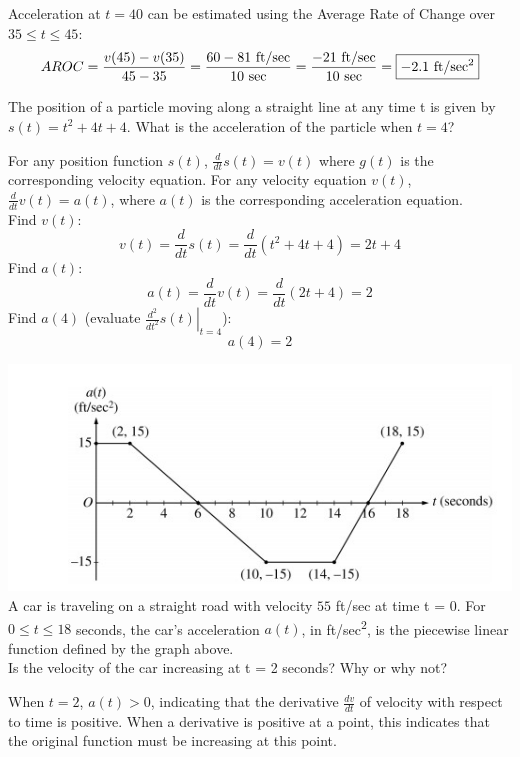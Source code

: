 \documentclass[12pt,letterpaper, onecolumn]{exam}
\newcommand\at[2]{\left.#1\right|_{#2}}
\begin{document}
\begin{questions}
\begin{solution}
	Acceleration at $t=40$ can be estimated using the Average Rate of Change over $35 \leq t \leq 45$:
	$$AROC=\frac{v(45)-v(35)}{45-35}=\frac{60-81 \text{ ft/sec}}{10 \text{ sec}}= \frac{-21\text{ ft/sec}}{10 \text{ sec}} = \boxed{-2.1 \text{ ft/sec\textsuperscript{2}}}$$
\end{solution}

\question
The position of a particle moving along a straight line at any time t is given by $s(t)=t^2+4t+4$. What is the acceleration of the particle when $t=4$?

\begin{solution}
	For any position function $s(t)$, $\frac{d}{dt} s(t) = v(t)$ where $g(t)$ is the corresponding velocity equation. For any velocity equation $v(t)$, $\frac{d}{dt} v(t) = a(t)$, where $a(t)$ is the corresponding acceleration equation. \\
	Find $v(t)$:
	$$v(t)=\frac{d}{dt} s(t) =\frac{d}{dt} (t^2+4t+4) = 2t+4 $$
	Find $a(t)$:
	$$a(t)=\frac{d}{dt} v(t) =\frac{d}{dt} (2t+4) = 2 $$
	Find $a(4)$ (evaluate $\at{\frac{d^{2}}{dt^{2}}s(t)}{t=4}$):
	$$\boxed{a(4)=2}$$
\end{solution}


\question
\includegraphics[width=0.7\linewidth]{Question10-001} \\
A car is traveling on a straight road with velocity $55$ ft/sec at time t = 0. For $0 \leq t \leq 18$ seconds, the car's acceleration $a(t)$, in ft/sec\textsuperscript{2}, is the piecewise linear function defined by the graph above. \\
Is the velocity of the car increasing at t = 2 seconds? Why or why not?
\begin{solution}
	When $t=2$, $a(t) > 0$, indicating that the derivative $\frac{dv}{dt}$ of velocity with respect to time is positive. When a derivative is positive at a point, this indicates that the original function must be increasing at this point. \\  
\end{solution}


\end{questions}
\end{document}
